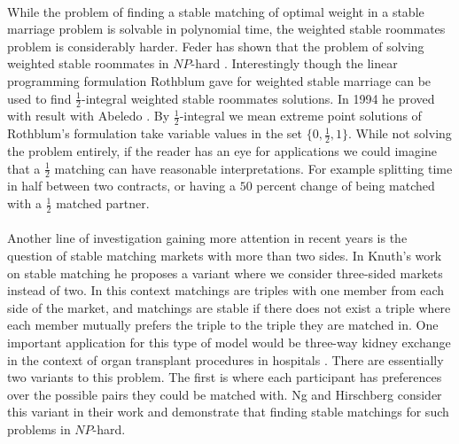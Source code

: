 \paragraph{}
While the problem of finding a stable matching of optimal weight in a stable marriage problem is solvable in polynomial time, the weighted stable roommates problem is considerably harder. Feder has shown that the problem of solving weighted stable roommates in $NP$-hard \cite{feder1992new}. Interestingly though the linear programming formulation Rothblum gave for weighted stable marriage can be used to find $\frac{1}{2}$-integral weighted stable roommates solutions. In 1994 he proved with result with Abeledo \cite{abeledo1994stable}. By $\frac{1}{2}$-integral we mean extreme point solutions of Rothblum's formulation take variable values in the set $\{0,\frac{1}{2},1\}$. While not solving the problem entirely, if the reader has an eye for applications we could imagine that a $\frac{1}{2}$ matching can have reasonable interpretations. For example splitting time in half between two contracts, or having a $50$ percent change of being matched with a $\frac{1}{2}$ matched partner.
\paragraph{}
Another line of investigation gaining more attention in recent years is the question of stable matching markets with more than two sides. In Knuth's work on stable matching he proposes a variant where we consider three-sided markets instead of two. In this context matchings are triples with one member from each side of the market, and matchings are stable if there does not exist a triple where each member mutually prefers the triple to the triple they are matched in. One important application for this type of model would be three-way kidney exchange in the context of organ transplant procedures in hospitals \cite{saidman2006increasing}. There are essentially two variants to this problem. The first is where each participant has preferences over the possible pairs they could be matched with.  Ng and Hirschberg \cite{ng1991three} consider this variant in their work and demonstrate that finding stable matchings for such problems in $NP$-hard.
